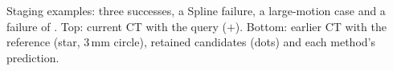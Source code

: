 \caption{Staging examples: three successes, a Spline failure, a large-motion case and a failure of \ours. Top: current CT with the query ($+$). Bottom: earlier CT with the reference (star, 3\,mm circle), retained candidates (dots) and each method's prediction.}
\label{fig:qualitative}
